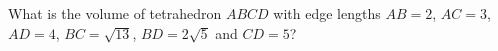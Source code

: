 What is the volume of tetrahedron $ABCD$ with edge lengths $AB=2$, $AC=3$, $AD=4$, $BC=\sqrt{13}$, $BD=2\sqrt5$ and $CD=5$?
